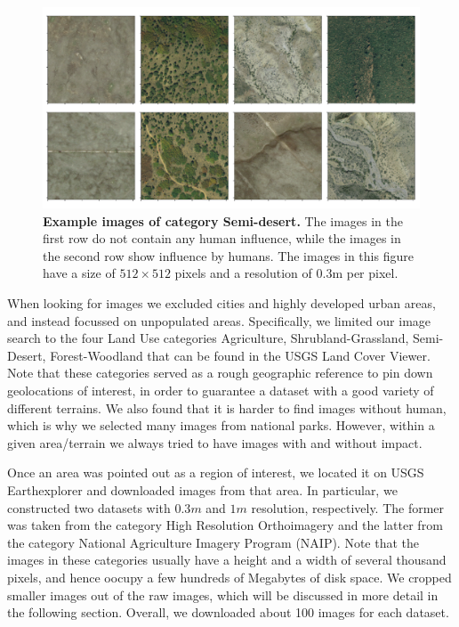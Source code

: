 \begin{figure}[h!]
	\centering
	\captionsetup{width=1\linewidth}
	\includegraphics[width=1\textwidth]{Figures/semi-desert_sample.pdf}
	\caption{\textbf{Example images of category Semi-desert.} The images in the first row do not contain any human influence, while the images in the second row show influence by humans. The images in this figure have a size of $512\times512$ pixels and a resolution of $0.3$m per pixel.}
	\label{fig:desert-sample}
\end{figure}

When looking for images we excluded cities and highly developed urban areas, and instead focussed on unpopulated areas. Specifically, we limited our image search to the four Land Use categories Agriculture, Shrubland-Grassland, Semi-Desert, Forest-Woodland that can be found in the USGS Land Cover Viewer. Note that these categories served as a rough geographic reference to pin down geolocations of interest, in order to guarantee a dataset with a good variety of different terrains. We also found that it is harder to find images without human, which is why we selected many images from national parks. However, within a given area/terrain we always tried to have images with and without impact.

Once an area was pointed out as a region of interest, we located it on USGS Earthexplorer and downloaded images from that area. In particular, we constructed two datasets with $0.3m$ and $1m$ resolution, respectively. The former was taken from the category High Resolution Orthoimagery and the latter from the category National Agriculture Imagery Program (NAIP). Note that the images in these categories usually have a height and a width of several thousand pixels, and hence oocupy a few hundreds of Megabytes of disk space. We cropped smaller images out of the raw images, which will be discussed in more detail in the following section. Overall, we downloaded about 100 images for each dataset.


